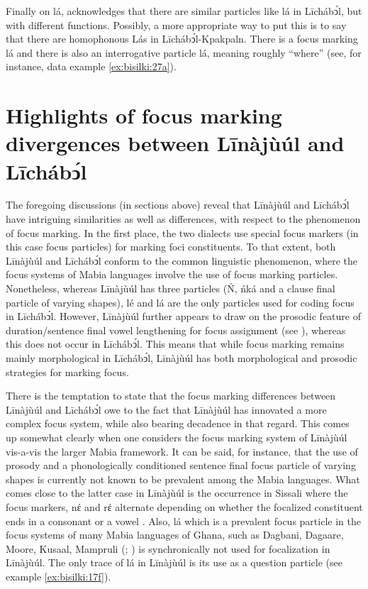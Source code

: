 \documentclass[output=paper,colorlinks,citecolor=brown]{langscibook}
\begin{document}
Finally on lá, \citet{Schwarz2009} acknowledges that there are similar particles like lá in Līchábͻ́l, but with different functions. Possibly, a more appropriate way to put this is to say that there are homophonous Lás in Līchábͻ́l-Kpakpaln. There is a focus marking lá and there is also an interrogative particle lá, meaning roughly “where” (see, for instance, data example \ref{ex:bisilki:27a}).

\section{Highlights of focus marking divergences between Līnàjùúl and Līchábͻ́l
}\label{sec:bisilki:8}

The foregoing discussions (in sections above) reveal that Līnàjùúl and Līchábͻ́l have intriguing similarities as well as differences, with respect to the phenomenon of focus marking. In the first place, the two dialects use special focus markers (in this case focus particles) for marking foci constituents. To that extent, both Līnàjùúl and Līchábͻ́l conform to the common linguistic phenomenon, where the focus systems of Mabia languages involve the use of focus marking particles. Nonetheless, whereas Līnàjùúl has three particles (Ń, ńká and a clause final particle of varying shapes), lé and lá are the only particles used for coding focus in Līchábͻ́l. However, Līnàjùúl further appears to draw on the prosodic feature of duration/sentence final vowel lengthening for focus assignment (see ), whereas this does not occur in Līchábͻ́l. This means that while focus marking remains mainly morphological in Līchábͻ́l, Līnàjùúl has both morphological and prosodic strategies for marking focus.

There is the temptation to state that the focus marking differences between Līnàjùúl and Līchábͻ́l owe to the fact that Līnàjùúl has innovated a more complex focus system, while also bearing decadence in that regard. This comes up somewhat clearly when one considers the focus marking system of Līnàjùúl vis-a-vis the larger Mabia framework. It can be said, for instance, that the use of prosody and a phonologically conditioned sentence final focus particle of varying shapes is currently not known to be prevalent among the Mabia languages. What comes close to the latter case in Līnàjùúl is the occurrence in Sissali where the focus markers, nέ and rέ alternate depending on whether the focalized constituent ends in a consonant or a vowel \citep{Dumah2017}. Also, lá which is a prevalent focus particle in the focus systems of many Mabia languages of Ghana, such as Dagbani, Dagaare, Moore, Kusaal, Mampruli (\citealt[93]{Bodomo1997}; \citealt{Dakubu2003, Issah2013Focus, Saanchi2005}) is synchronically not used for focalization in Līnàjùúl. The only trace of lá in Līnàjùúl is its use as a question particle (see example \ref{ex:bisilki:17f}).
\end{document}

